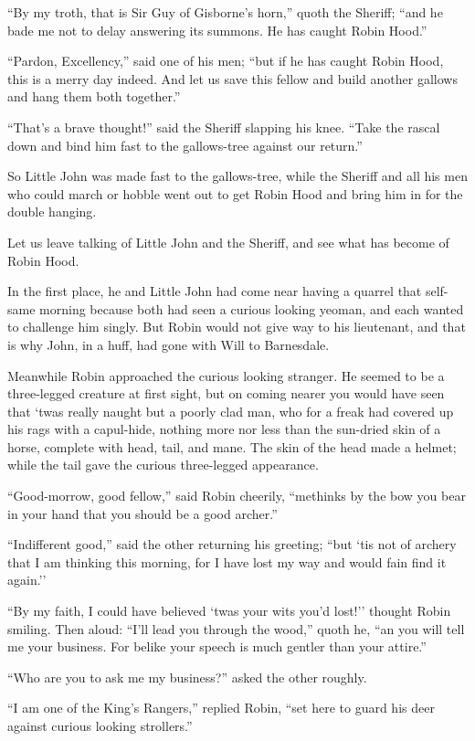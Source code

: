 ``By my troth, that is Sir Guy of Gisborne's horn,'' quoth the Sheriff;
``and he bade me not to delay answering its summons. He has caught Robin
Hood.''

``Pardon, Excellency,'' said one of his men; ``but if he has caught
Robin Hood, this is a merry day indeed. And let us save this fellow and
build another gallows and hang them both together.''

``That's a brave thought!'' said the Sheriff slapping his knee. ``Take
the rascal down and bind him fast to the gallows-tree against our
return.''

So Little John was made fast to the gallows-tree, while the Sheriff and
all his men who could march or hobble went out to get Robin Hood and
bring him in for the double hanging.

Let us leave talking of Little John and the Sheriff, and see what has
become of Robin Hood.

In the first place, he and Little John had come near having a quarrel
that self-same morning because both had seen a curious looking yeoman,
and each wanted to challenge him singly. But Robin would not give way to
his lieutenant, and that is why John, in a huff, had gone with Will to
Barnesdale.

Meanwhile Robin approached the curious looking stranger. He seemed to be
a three-legged creature at first sight, but on coming nearer you would
have seen that `twas really naught but a poorly clad man, who for a
freak had covered up his rags with a capul-hide, nothing more nor less
than the sun-dried skin of a horse, complete with head, tail, and mane.
The skin of the head made a helmet; while the tail gave the curious
three-legged appearance.

``Good-morrow, good fellow,'' said Robin cheerily, ``methinks by the bow
you bear in your hand that you should be a good archer.''

``Indifferent good,'' said the other returning his greeting; ``but `tis
not of archery that I am thinking this morning, for I have lost my way
and would fain find it again.''

``By my faith, I could have believed `twas your wits you'd lost!''
thought Robin smiling. Then aloud: ``I'll lead you through the wood,''
quoth he, ``an you will tell me your business. For belike your speech is
much gentler than your attire.''

``Who are you to ask me my business?'' asked the other roughly.

``I am one of the King's Rangers,'' replied Robin, ``set here to guard
his deer against curious looking strollers.''


